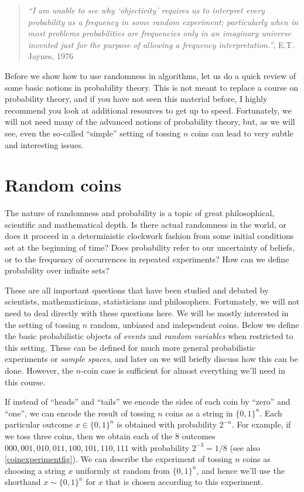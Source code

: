 \begin{quote}
\emph{``I am unable to see why `objectivity' requires us to interpret
every probability as a frequency in some random experiment; particularly
when in most problems probabilities are frequencies only in an imaginary
universe invented just for the purpose of allowing a frequency
interpretation.''}, E.T. Jaynes, 1976
\end{quote}

Before we show how to use randomness in algorithms, let us do a quick
review of some basic notions in probability theory. This is not meant to
replace a course on probability theory, and if you have not seen this
material before, I highly recommend you look at additional resources to
get up to speed. Fortunately, we will not need many of the advanced
notions of probability theory, but, as we will see, even the so-called
``simple'' setting of tossing \(n\) coins can lead to very subtle and
interesting issues.

\section{Random coins}\label{Random-coins}

The nature of randomness and probability is a topic of great
philosophical, scientific and mathematical depth. Is there actual
randomness in the world, or does it proceed in a deterministic clockwork
fashion from some initial conditions set at the beginning of time? Does
probability refer to our uncertainty of beliefs, or to the frequency of
occurrences in repeated experiments? How can we define probability over
infinite sets?

These are all important questions that have been studied and debated by
scientists, mathematicians, statisticians and philosophers. Fortunately,
we will not need to deal directly with these questions here. We will be
mostly interested in the setting of tossing \(n\) random, unbiased and
independent coins. Below we define the basic probabilistic objects of
\emph{events} and \emph{random variables} when restricted to this
setting. These can be defined for much more general probabilistic
experiments or \emph{sample spaces}, and later on we will briefly
discuss how this can be done. However, the \(n\)-coin case is sufficient
for almost everything we'll need in this course.

If instead of ``heads'' and ``tails'' we encode the sides of each coin
by ``zero'' and ``one'', we can encode the result of tossing \(n\) coins
as a string in \(\{0,1\}^n\). Each particular outcome \(x\in \{0,1\}^n\)
is obtained with probability \(2^{-n}\). For example, if we toss three
coins, then we obtain each of the 8 outcomes
\(000,001,010,011,100,101,110,111\) with probability \(2^{-3}=1/8\) (see
also \cref{coinexperimentfig}). We can describe the experiment of
tossing \(n\) coins as choosing a string \(x\) uniformly at random from
\(\{0,1\}^n\), and hence we'll use the shorthand \(x\sim \{0,1\}^n\) for
\(x\) that is chosen according to this experiment.


